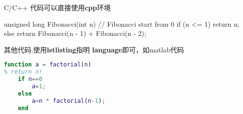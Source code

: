 C/C++ 代码可以直接使用\textbf{cpp}环境

\begin{cpp}[caption={斐波那契C++}]
unsigned long Fibonacci(int n)
{
    // Fibonacci start from 0
    if (n <= 1) 
    {
        return n;
    }
    else 
    {
        return Fibonacci(n - 1) + Fibonacci(n - 2);
    }
}
\end{cpp}

其他代码,使用\textbf{lstlisting}指明 \textbf{language}即可，如matlab代码

\begin{lstlisting}[caption={Matlab代码},language=Matlab]
function a = factorial(n)
% return n!
    if n==0
        a=1;
    else
        a=n * factorial(n-1);
    end
\end{lstlisting}
